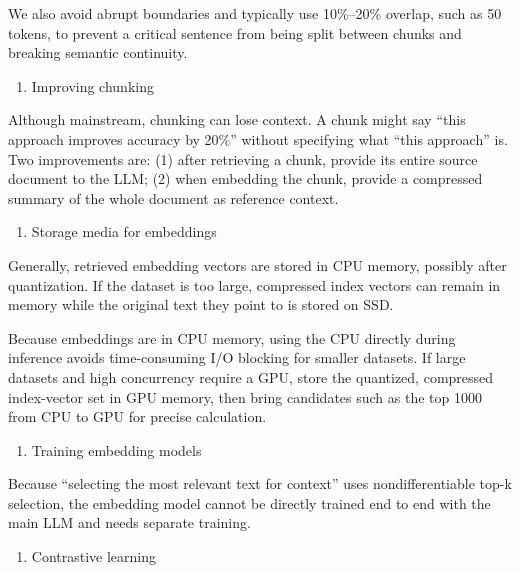 We also avoid abrupt boundaries and typically use 10\%--20\% overlap, such as 50 tokens, to prevent a critical sentence from being split between chunks and breaking semantic continuity.

\begin{enumerate}
\def\labelenumi{\arabic{enumi}.}
\setcounter{enumi}{1}
\tightlist
\item
  Improving chunking
\end{enumerate}

Although mainstream, chunking can lose context. A chunk might say ``this approach improves accuracy by 20\%'' without specifying what ``this approach'' is. Two improvements are: (1) after retrieving a chunk, provide its entire source document to the LLM; (2) when embedding the chunk, provide a compressed summary of the whole document as reference context.

\begin{enumerate}
\def\labelenumi{(\Roman{enumi})}
\setcounter{enumi}{1}
\tightlist
\item
  Storage media for embeddings
\end{enumerate}

Generally, retrieved embedding vectors are stored in CPU memory, possibly after quantization. If the dataset is too large, compressed index vectors can remain in memory while the original text they point to is stored on SSD.

Because embeddings are in CPU memory, using the CPU directly during inference avoids time-consuming I/O blocking for smaller datasets. If large datasets and high concurrency require a GPU, store the quantized, compressed index-vector set in GPU memory, then bring candidates such as the top 1000 from CPU to GPU for precise calculation.

\begin{enumerate}
\def\labelenumi{(\Roman{enumi})}
\setcounter{enumi}{2}
\tightlist
\item
  Training embedding models
\end{enumerate}

Because ``selecting the most relevant text for context'' uses nondifferentiable top-k selection, the embedding model cannot be directly trained end to end with the main LLM and needs separate training.

\begin{enumerate}
\def\labelenumi{\arabic{enumi}.}
\tightlist
\item
  Contrastive learning
\end{enumerate}

